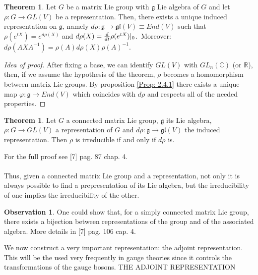 \documentclass[12pt,a4paper]{report}
\theoremstyle{definition}
\theoremstyle{Theorem}
\newtheorem{Theo}[Def]{Theorem}
\theoremstyle{definition}
\theoremstyle{definition}
\newtheorem{Obs}[Def]{Observation}
\begin{document}
		\begin{Theo}
			Let $G$ be a matrix Lie group with $\mathfrak{g}$ Lie algebra of $G$ and let $\rho:G\rightarrow GL(V)$ be a representation. Then, there exists a unique induced representation on $\mathfrak{g}$, namely $d\rho:\mathfrak{g}\rightarrow \mathfrak{gl}(V)\equiv End(V)$ such that $\rho(e^{tX})=e^{d\rho(X)}$ and $d\rho(X)={d\over dt}\rho(e^{tX})|_0$.\
			Moreover: $d\rho(AXA^{-1})=\rho(A)d\rho(X)\rho(A)^{-1}$.	
		\end{Theo}
		\begin{proof} [Idea of proof]
			After fixing a base, we can identify $GL(V)$ with $GL_n(\mathbb{C})$ (or $\mathbb{R}$), then, if we assume the hypothesis of the theorem, $\rho$ becomes a homomorphism between matrix Lie groups. By proposition \ref{Prop: 2.4.1} there exists a unique map $\varphi:\mathfrak{g}\rightarrow End(V)$ which coincides with $d\rho$ and respects all of the needed properties.
		\end{proof}
		\begin{Theo}\label{Theo: 3.1}
			Let $G$ a connected matrix Lie group, $\mathfrak{g}$ its Lie algebra, $\rho:G\rightarrow GL(V)$ a representation of $G$ and $d\rho:\mathfrak{g}\rightarrow \mathfrak{gl}(V)$ the induced representation. Then $\rho$ is irreducible if and only if $d\rho$ is.
		\end{Theo}
		For the full proof see [7] pag. 87 chap. 4.\\
		\\
		Thus, given a connected matrix Lie group and a representation, not only it is always possible to find a prepresentation of its Lie algebra, but the irreducibility of one implies the irreducibility of the other.
		\begin{Obs}
			One could show that, for a simply connected matrix Lie group, there exists a bijection between representations of the group and of the associated algebra. More details in [7] pag. 106 cap. 4.
		\end{Obs}
		We now construct a very important representation: the adjoint representation. This will be the used very frequently in gauge theories since it controls the transformations of the gauge bosons.
		THE ADJOINT REPRESENTATION
\end{document}
